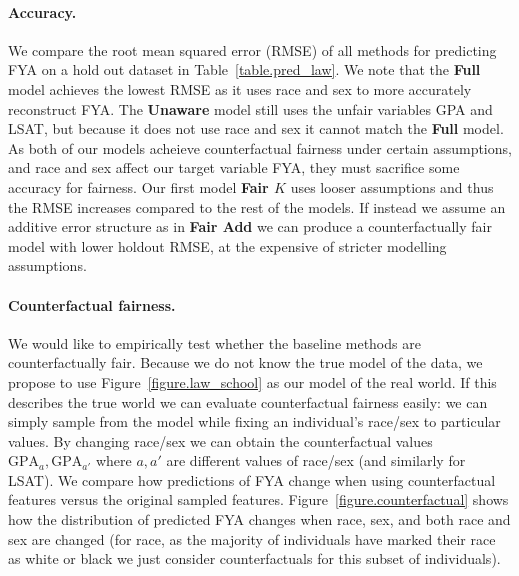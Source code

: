 \paragraph{Accuracy.}
We compare the root mean squared error (RMSE) of all methods for predicting FYA on a hold out dataset in Table~\ref{table.pred_law}.  We note that the \textbf{Full} model achieves the lowest RMSE as it uses race and sex to more accurately reconstruct FYA. The \textbf{Unaware} model still uses the unfair variables GPA and LSAT, but because it does not use race and sex it cannot match the \textbf{Full} model. As both of our models acheieve counterfactual fairness under certain assumptions, and race and sex affect our target variable FYA, they must sacrifice some accuracy for fairness. Our first model \textbf{Fair $K$} uses looser assumptions and thus the RMSE increases compared to the rest of the models. If instead we assume an additive error structure as in \textbf{Fair Add} we can produce a counterfactually fair model with lower holdout RMSE, at the expensive of stricter modelling assumptions.


\paragraph{Counterfactual fairness.}
We would like to empirically test whether the baseline methods are counterfactually fair. Because we do not know the true model of the data, we propose to use Figure~\ref{figure.law_school} as our model of the real world. If this describes the true world we can evaluate counterfactual fairness easily: we can simply sample from the model while fixing an individual's race/sex to particular values. By changing race/sex we can obtain the counterfactual values $\mbox{GPA}_a,\mbox{GPA}_{a'}$ where $a,a'$ are different values of race/sex (and similarly for LSAT). We compare how predictions of FYA change when using counterfactual features versus the original sampled features. Figure~\ref{figure.counterfactual} shows how the distribution of predicted FYA changes when race, sex, and both race and sex are changed (for race, as the majority of individuals have marked their race as white or black we just consider counterfactuals for this subset of individuals).


 


